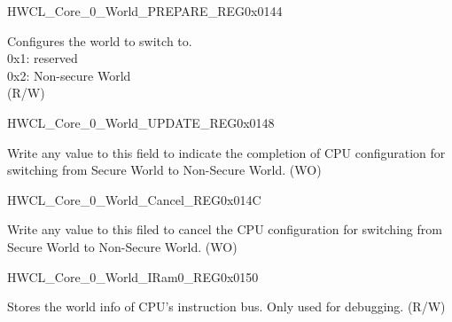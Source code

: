 \begin{register}{H}{WCL\_Core\_0\_World\_PREPARE\_REG}{0x0144}\label{regdesc:WCLCORE0WORLDPREPAREREG}
%
%
\regnewline%
\begin{regdesc}\begin{reglist}
\label{fielddesc:WCLCORE0WORLDPREPARE}\item [WCL\_CORE\_0\_WORLD\_PREPARE] Configures the world to switch to.\\
0x1: reserved\\
0x2: Non-secure World\\
(R/W)
\end{reglist}\end{regdesc}
\end{register}


\begin{register}{H}{WCL\_Core\_0\_World\_UPDATE\_REG}{0x0148}\label{regdesc:WCLCORE0WORLDUPDATEREG}
%
\regnewline%
\begin{regdesc}\begin{reglist}
\label{fielddesc:WCLCORE0UPDATE}\item [WCL\_CORE\_0\_UPDATE] Write any value to this field to indicate the completion of CPU configuration for switching from Secure World to Non-Secure World. (WO)
\end{reglist}\end{regdesc}
\end{register}


\begin{register}{H}{WCL\_Core\_0\_World\_Cancel\_REG}{0x014C}\label{regdesc:WCLCORE0WORLDCANCELREG}
%
\regnewline%
\begin{regdesc}\begin{reglist}
\label{fielddesc:WCLCORE0WORLDCANCEL}\item [WCL\_CORE\_0\_WORLD\_CANCEL]  Write any value to this filed to cancel the CPU configuration for switching from Secure World to Non-Secure World. (WO)
\end{reglist}\end{regdesc}
\end{register}


\begin{register}{H}{WCL\_Core\_0\_World\_IRam0\_REG}{0x0150}\label{regdesc:WCLCORE0WORLDIRAM0REG}
%
%
\regnewline%
\begin{regdesc}\begin{reglist}
\label{fielddesc:WCLCORE0WORLDIRAM0}\item [WCL\_CORE\_0\_WORLD\_IRAM0] Stores the world info of CPU's instruction bus. Only used for debugging. (R/W)
\end{reglist}\end{regdesc}
\end{register}


